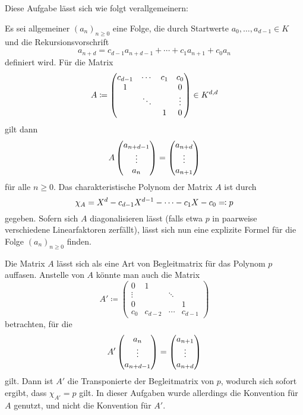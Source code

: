 \section{}

Diese Aufgabe lässt sich wie folgt verallgemeinern:

Es sei allgemeiner $(a_n)_{n \geq 0}$ eine Folge, die durch Startwerte $a_0, \dotsc, a_{d-1} \in K$ und die Rekursionsvorschrift
\[
    a_{n+d}
  = c_{d-1} a_{n+d-1} + \dotsb + c_1 a_{n+1} + c_0 a_{n}
\]
definiert wird.
Für die Matrix
\[
            A
  \coloneqq \begin{pmatrix}
              c_{d-1} & \cdots  & c_1 & c_0     \\
              1       &         &     & 0       \\
                      & \ddots  &     & \vdots  \\
                      &         & 1   & 0
            \end{pmatrix}
  \in       \matrices{d}{K}
\]
gilt dann
\[
    A \columnvector{a_{n+d-1} \\ \vdots \\ a_n}
  =   \columnvector{a_{n+d} \\ \vdots \\ a_{n+1}}
\]
für alle $n \geq 0$.
Das charakteristische Polynom der Matrix $A$ ist durch
\[
              \charpoly{A}
  =           X^d - c_{d-1} X^{d-1} - \dotsb - c_1 X - c_0
  \definedas  p
\]
gegeben.
Sofern sich $A$ diagonalisieren lässt (falls etwa $p$ in paarweise verschiedene Linearfaktoren zerfällt), lässt sich nun eine explizite Formel für die Folge $(a_n)_{n \geq 0}$ finden.

\begin{remark}
  Die Matrix $A$ lässt sich als eine Art von Begleitmatrix für das Polynom $p$ auffasen.
  Anstelle von $A$ könnte man auch die Matrix
  \[
              A'
    \coloneqq \begin{pmatrix}
                0       & 1       &         &         \\
                \vdots  &         & \ddots  &         \\
                0       &         &         & 1       \\
                c_0     & c_{d-2} & \cdots  & c_{d-1}
              \end{pmatrix}
  \]
  betrachten, für die
  \[
      A' \columnvector{a_n \\ \vdots \\ a_{n+d-1}}
    =    \columnvector{a_{n+1} \\ \vdots \\ a_{n+d}}
  \]
  gilt.
  Dann ist $A'$ die Transponierte der Begleitmatrix von $p$, wodurch sich sofort ergibt, dass $\chi_{A'} = p$ gilt.
  In dieser Aufgaben wurde allerdings die Konvention für $A$ genutzt, und nicht die Konvention für $A'$.
\end{remark}



